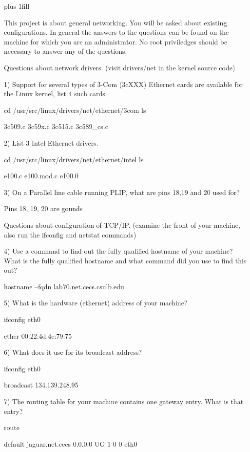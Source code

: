 
\rightskip=0pt plus 1fill

\parindent 0pt

This project is about general networking.
You will be asked about existing configurations. 
In general the answers to the questions can be found on the machine for
which you are an administrator.
No root priviledges should be necessary to answer any of the questions.

Questions about network drivers.
(visit {\ltt{}drivers/net} in the kernel source code)

1) Support for several types of 3-Com (3cXXX) Ethernet cards are available
for the Linux kernel, list 4 such cards.

cd /usr/src/linux/drivers/net/ethernet/3com
ls

3c509.c 
3c59x.c
3c515.c  
3c589_cs.c

2) List 3 Intel Ethernet drivers. 

cd /usr/src/linux/drivers/net/ethernet/intel
ls

e100.c
e100.mod.c
e100.0

3) On a Parallel line cable running PLIP, what are pins 18,19 and 20 used for?

Pins 18, 19, 20 are gounds

Questions about configuration of TCP/IP.
(examine the front of your machine, also run the ifconfig and netstat commands)

4) Use a command to find out the fully qualified hostname of your machine?
What is the fully qualified hostname and what command did you use to find this out?

hostname --fqdn
lab70.net.cecs.csulb.edu

5) What is the hardware (ethernet) address of your machine?

ifconfig eth0

ether 00:22:4d:4c:79:75

6) What does it use for its broadcast address?

ifconfig eth0

broadcast 134.139.248.95

7) The routing table for your machine contains one gateway entry.
What is that entry?

route

default         jaguar.net.cecs 0.0.0.0         UG    1      0        0 eth0

